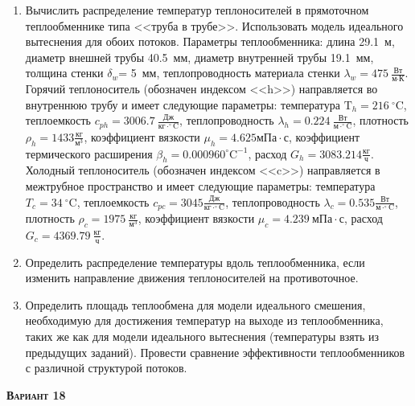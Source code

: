 \begin{enumerate} 
\item Вычислить распределение температур теплоносителей в прямоточном теплообменнике типа <<труба в трубе>>. Использовать модель идеального вытеснения для обоих потоков. Параметры теплообменника: длина  29.1~м, диаметр внешней трубы 40.5~мм,  диаметр внутренней трубы 19.1~мм, толщина стенки $\delta_{w}$=     5~мм,  теплопроводность материала стенки $\lambda_{w}=  475~\frac{\text{Вт}}{\text{м} \cdot \text{К}}$.  Горячий теплоноситель (обозначен индексом <<h>>) направляется во внутреннюю трубу и	 имеет следующие параметры: температура $\text{T}_{h}= 216~^\circ\mathrm{C}$, теплоемкость	  $c_{p{h}}= 3006.7~\frac{\text{Дж}}{\text{кг} \cdot ^\circ\mathrm{C}}$, теплопроводность 		$\lambda_{h}= 0.224~\frac{\text{Вт}}{\text{м} \cdot ^\circ\mathrm{C}}$, плотность 		$\rho_{h}= 1433 \frac{\text{кг}}{\text{м}^3}$, коэффициент вязкости $\mu_{h}=4.625 \text{мПа} 		\cdot \text{с} $, коэффициент термического расширения $\beta_{h}=0.000960 ^\circ\mathrm{C}^{-1}$,		 расход $G_{h}= 3083.214 \frac{\text{кг}}{\text{ч}}$. Холодный теплоноситель (обозначен индексом <<c>>) 		 направляется в межтрубное пространство и имеет следующие параметры: температура $T_{c}=   34		 ~^\circ\mathrm{C}$, теплоемкость $c_{p{c}}= 3045 \frac{\text{Дж}}{\text{кг} \cdot ^\circ\mathrm{C}}$,			 теплопроводность $\lambda_{c}=0.535 \frac{\text{Вт}}{\text{м} \cdot ^\circ\mathrm{C}}$, плотность 			 $\rho_{c}=  1975~\frac{\text{кг}}{\text{м}^3}$, коэффициент вязкости $\mu_{c}=4.239~\text{мПа} \cdot \text{с} $, 			 расход $G_{c}=4369.79~\frac{\text{кг}}{\text{ч}}$. 

\item Определить распределение температуры вдоль теплообменника, если 	изменить направление движения теплоносителей на противоточное.

\item Определить площадь теплообмена для модели идеального смешения, необходимую для достижения 	температур на выходе из теплообменника, таких же как для модели идеального вытеснения (температуры взять из предыдущих заданий).	Провести сравнение эффективности теплообменников с различной структурой потоков.

\end{enumerate}

\textsc{\textbf{Вариант 18}}

